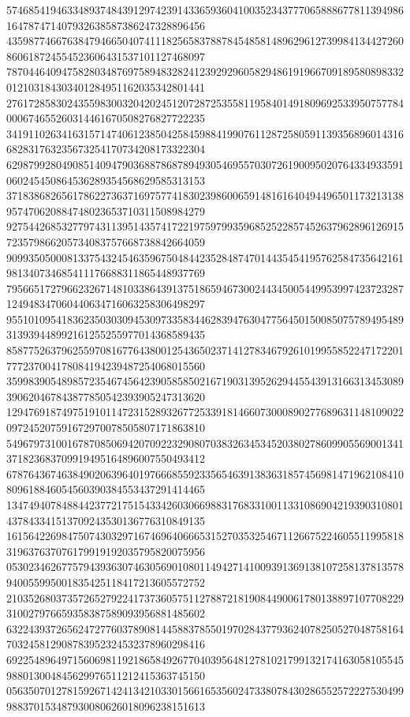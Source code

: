 \begin{DoxyCode}
      574685419463348937484391297423914336593604100352343777065888677811394986164787471407932638587386247328896456
      435987746676384794665040741118256583788784548581489629612739984134427260860618724554523606431537101127468097
      787044640947582803487697589483282412392929605829486191966709189580898332012103184303401284951162035342801441
      276172858302435598300320420245120728725355811958401491809692533950757784000674655260314461670508276827722235
      341911026341631571474061238504258459884199076112872580591139356896014316682831763235673254170734208173322304
      629879928049085140947903688786878949305469557030726190095020764334933591060245450864536289354568629585313153
      371838682656178622736371697577418302398600659148161640494496501173213138957470620884748023653710311508984279
      927544268532779743113951435741722197597993596852522857452637962896126915723579866205734083757668738842664059
      909935050008133754324546359675048442352848747014435454195762584735642161981340734685411176688311865448937769
      795665172796623267148103386439137518659467300244345005449953997423723287124948347060440634716063258306498297
      955101095418362350303094530973358344628394763047756450150085075789495489313939448992161255255977014368589435
      858775263796255970816776438001254365023714127834679261019955852247172201777237004178084194239487254068015560
      359983905489857235467456423905858502167190313952629445543913166313453089390620467843877850542393905247313620
      129476918749751910114723152893267725339181466073000890277689631148109022097245207591672970078505807171863810
      549679731001678708506942070922329080703832634534520380278609905569001341371823683709919495164896007550493412
      678764367463849020639640197666855923356546391383631857456981471962108410809618846054560390384553437291414465
      134749407848844237721751543342603066988317683310011331086904219390310801437843341513709243530136776310849135
      161564226984750743032971674696406665315270353254671126675224605511995818319637637076179919192035795820075956
      053023462677579439363074630569010801149427141009391369138107258137813578940055995001835425118417213605572752
      210352680373572652792241737360575112788721819084490061780138897107708229310027976659358387589093956881485602
      632243937265624727760378908144588378550197028437793624078250527048758164703245812908783952324532378960298416
      692254896497156069811921865849267704039564812781021799132174163058105545988013004845629976511212415363745150
      056350701278159267142413421033015661653560247338078430286552572227530499988370153487930080626018096238151613

\end{DoxyCode}
